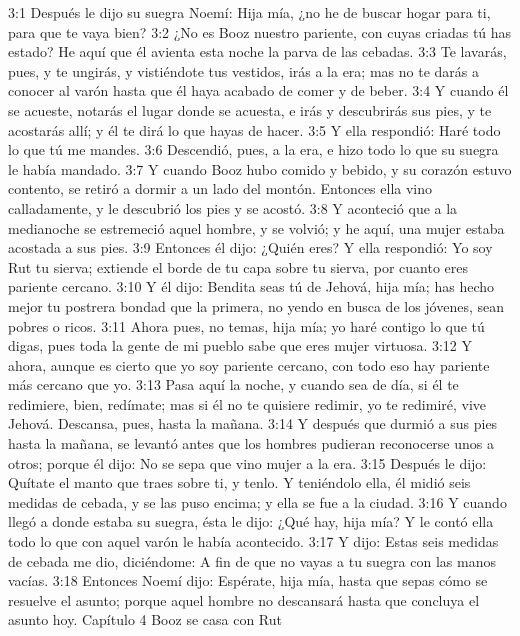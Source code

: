 3:1 Después le dijo su suegra Noemí: Hija mía, ¿no he de buscar hogar para ti, para que te vaya bien?  
3:2 ¿No es Booz nuestro pariente, con cuyas criadas tú has estado? He aquí que él avienta esta noche la parva de las cebadas.  
3:3 Te lavarás, pues, y te ungirás, y vistiéndote tus vestidos, irás a la era; mas no te darás a conocer al varón hasta que él haya acabado de comer y de beber.  
3:4 Y cuando él se acueste, notarás el lugar donde se acuesta, e irás y descubrirás sus pies, y te acostarás allí; y él te dirá lo que hayas de hacer.  
3:5 Y ella respondió: Haré todo lo que tú me mandes.  
3:6 Descendió, pues, a la era, e hizo todo lo que su suegra le había mandado.  
3:7 Y cuando Booz hubo comido y bebido, y su corazón estuvo contento, se retiró a dormir a un lado del montón. Entonces ella vino calladamente, y le descubrió los pies y se acostó.  
3:8 Y aconteció que a la medianoche se estremeció aquel hombre, y se volvió; y he aquí, una mujer estaba acostada a sus pies.  
3:9 Entonces él dijo: ¿Quién eres? Y ella respondió: Yo soy Rut tu sierva; extiende el borde de tu capa sobre tu sierva, por cuanto eres pariente cercano.  
3:10 Y él dijo: Bendita seas tú de Jehová, hija mía; has hecho mejor tu postrera bondad que la primera, no yendo en busca de los jóvenes, sean pobres o ricos.  
3:11 Ahora pues, no temas, hija mía; yo haré contigo lo que tú digas, pues toda la gente de mi pueblo sabe que eres mujer virtuosa.  
3:12 Y ahora, aunque es cierto que yo soy pariente cercano, con todo eso hay pariente más cercano que yo.  
3:13 Pasa aquí la noche, y cuando sea de día, si él te redimiere, bien, redímate; mas si él no te quisiere redimir, yo te redimiré, vive Jehová. Descansa, pues, hasta la mañana.  
3:14 Y después que durmió a sus pies hasta la mañana, se levantó antes que los hombres pudieran reconocerse unos a otros; porque él dijo: No se sepa que vino mujer a la era.  
3:15 Después le dijo: Quítate el manto que traes sobre ti, y tenlo. Y teniéndolo ella, él midió seis medidas   de cebada, y se las puso encima; y ella se fue a la ciudad.  
3:16 Y cuando llegó a donde estaba su suegra, ésta le dijo: ¿Qué hay, hija mía? Y le contó ella todo lo que con aquel varón le había acontecido.  
3:17 Y dijo: Estas seis medidas   de cebada me dio, diciéndome: A fin de que no vayas a tu suegra con las manos vacías.  
3:18 Entonces Noemí dijo: Espérate, hija mía, hasta que sepas cómo se resuelve el asunto; porque aquel hombre no descansará hasta que concluya el asunto hoy.  
Capítulo 4
Booz se casa con Rut  


